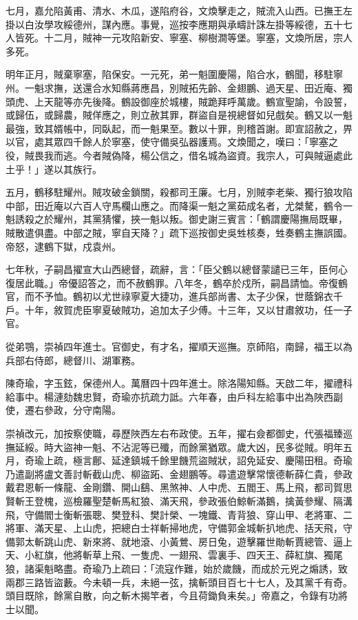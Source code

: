 \begin{pinyinscope}
七月，嘉允陷黃甫、清水、木瓜，遂陷府谷，文煥擊走之，賊流入山西。已撫王左掛以白汝學攻綏德州，謀內應。事覺，巡按李應期與承疇計誅左掛等綏德，五十七人皆死。十二月，賊神一元攻陷新安、寧塞、柳樹澗等堡。寧塞，文煥所居，宗人多死。

明年正月，賊棄寧塞，陷保安。一元死，弟一魁圍慶陽，陷合水，鶴聞，移駐寧州。一魁求撫，送還合水知縣蔣應昌，別賊拓先齡、金翅鵬、過天星、田近庵、獨頭虎、上天龍等亦先後降。鶴設御座於城樓，賊跪拜呼萬歲。鶴宣聖諭，令設誓，或歸伍，或歸農，賊佯應之，則立赦其罪，群盜自是視總督如兒戲矣。鶴又以一魁最強，致其婿帳中，同臥起，而一魁果至。數以十罪，則稽首謝。即宣詔赦之，畀以官，處其眾四千餘人於寧塞，使守備吳弘器護焉。文煥聞之，嘆曰：「寧塞之役，賊畏我而逃。今者賊偽降，楊公信之，借名城為盜資。我宗人，可與賊逼處此土乎！」遂以其族行。

五月，鶴移駐耀州。賊攻破金鎖關，殺都司王廉。七月，別賊李老柴、獨行狼攻陷中部，田近庵以六百人守馬欄山應之。而降渠一魁之黨茹成名者，尤桀驁，鶴令一魁誘殺之於耀州，其黨猜懼，挾一魁以叛。御史謝三賓言：「鶴謂慶陽撫局既畢，賊散遣俱盡。中部之賊，寧自天降？」疏下巡按御史吳甡核奏，甡奏鶴主撫誤國。帝怒，逮鶴下獄，戍袁州。

七年秋，子嗣昌擢宣大山西總督，疏辭，言：「臣父鶴以總督蒙譴已三年，臣何心復居此職。」帝優詔答之，而不赦鶴罪。八年冬，鶴卒於戍所，嗣昌請恤。帝復鶴官，而不予恤。鶴初以尤世祿寧夏大捷功，進兵部尚書、太子少保，世蔭錦衣千戶。十年，敘賀虎臣寧夏破賊功，追加太子少傅。十三年，又以甘肅敘功，任一子官。

從弟鶚，崇禎四年進士。官御史，有才名，擢順天巡撫。京師陷，南歸，福王以為兵部右侍郎，總督川、湖軍務。

陳奇瑜，字玉鉉，保德州人。萬曆四十四年進士。除洛陽知縣。天啟二年，擢禮科給事中。楊漣劾魏忠賢，奇瑜亦抗疏力詆。六年春，由戶科左給事中出為陜西副使，遷右參政，分守南陽。

崇禎改元，加按察使職，尋歷陜西左右布政使。五年，擢右僉都御史，代張福臻巡撫延綏。時大盜神一魁、不沾泥等已殲，而餘黨猶眾。歲大凶，民多從賊。明年五月，奇瑜上疏，極言鄜、延達鎮城千餘里饑荒盜賊狀，詔免延安、慶陽田租。奇瑜乃遣副將盧文善討斬截山虎、柳盜跖、金翅鵬等。尋遣遊擊常懷德斬薛仁貴，參政戴君恩斬一條龍、金剛鑽、開山鷂、黑煞神、人中虎、五閻王、馬上飛，都司賀思賢斬王登槐，巡檢羅聖楚斬馬紅狼、滿天飛，參政張伯鯨斬滿鵝，擒黃參耀、隔溝飛，守備閻士衡斬張聰、樊登科、樊計榮、一塊鐵、青背狼、穿山甲、老將軍、二將軍、滿天星、上山虎，把總白士祥斬掃地虎，守備郭金城斬扒地虎、括天飛，守備郭太斬跳山虎、新來將、就地滾、小黃鶯、房日兔，遊擊羅世勛斬賈總管、逼上天、小紅旗，他將斬草上飛、一隻虎、一翅飛、雲裏手、四天王、薛紅旗、獨尾狼，諸渠魁略盡。奇瑜乃上疏曰：「流寇作難，始於歲饑，而成於元兇之煽誘，致兩郡三路皆盜藪。今未頓一兵，未絕一弦，擒斬頭目百七十七人，及其黨千有奇。頭目既除，餘黨自散，向之斬木揭竿者，今且荷鋤負耒矣。」帝嘉之，令錄有功將士以聞。


\end{pinyinscope}
